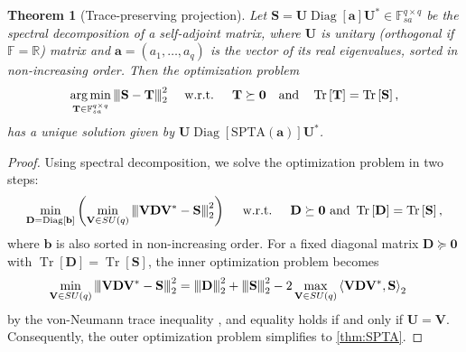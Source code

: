 \documentclass[noinfoline]{imsart}\setcounter{tocdepth}{2}
\renewcommand{\b}[1]{\mathbb{#1}} %
\newcommand{\m}[1]{\mathbf{#1}} %
\newcommand{\tr}[1]{\operatorname{Tr}\left[#1\right]}
\newcommand{\vertiii}[1]{{\left\vert\kern-0.25ex\left\vert\kern-0.25ex\left\vert #1 
    \right\vert\kern-0.25ex\right\vert\kern-0.25ex\right\vert}} %
\newcommand{\innpr}[2]{{\left\langle {#1},{#2}\right\rangle}} %
\newcommand{\Diag}{\operatorname{Diag}}
\DeclareMathOperator*{\argmin}{\arg\min}
\theoremstyle{plain}
\newtheorem{theorem}{Theorem}[section]
\begin{document}
\begin{appendix}
\begin{theorem}[Trace-preserving projection]
Let $\m{S} = \m{U} \Diag[\m{a}] \m{U}^{*} \in \b{F}_{sa}^{q \times q}$ be the spectral decomposition of a self-adjoint matrix, where $\m{U}$ is unitary (orthogonal if $\b{F} = \b{R}$) matrix and $\m{a} = (a_1, \dots, a_q)$ is the vector of its real eigenvalues, sorted in non-increasing order.
Then the optimization problem
\begin{equation*}
    \argmin_{\m{T} \in \b{F}_{sa}^{q \times q}} \vertiii{\m{S} - \m{T}}_{2}^{2} \quad \text{ w.r.t. } \quad \m{T} \succeq \m{0} \quad \text{and} \quad \tr{\m{T}} = \tr{\m{S}},
\end{equation*}
has a unique solution given by $\m{U} \Diag[\mathrm{SPTA}(\m{a})] \m{U}^{*}$.
\end{theorem}
\begin{proof}
Using spectral decomposition, we solve the optimization problem in two steps:
\begin{equation*}
    \min_{\m{D} = \Diag[\m{b}]} \left( \min_{\m{V} \in SU(q)} \vertiii{\m{V} \m{D} \m{V}^{*} - \m{S}}_{2}^{2} \right) \quad \text{ w.r.t. } \quad \m{D} \succeq \m{0} \text{ and } \tr{\m{D}} = \tr{\m{S}},
\end{equation*}
where $\m{b}$ is also sorted in non-increasing order. For a fixed diagonal matrix $\m{D} \succeq \m{0}$ with $\tr{\m{D}} = \tr{\m{S}}$, the inner optimization problem becomes
\begin{align*}
    \min_{\m{V} \in SU(q)} \vertiii{\m{V} \m{D} \m{V}^{*} - \m{S}}_{2}^{2} &= \vertiii{\m{D}}_{2}^{2} + \vertiii{\m{S}}_{2}^{2} - 2 \max_{\m{V} \in SU(q)} \innpr{\m{V} \m{D} \m{V}^{*}}{\m{S}}_{2}
\end{align*}
by the von-Neumann trace inequality \cite{horn2012matrix}, and equality holds if and only if $\m{U} = \m{V}$. Consequently, the outer optimization problem simplifies to \cref{thm:SPTA}.
\end{proof}




\end{appendix}
\end{document}

